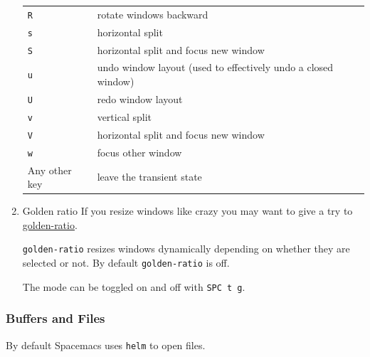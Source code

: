 \documentclass[11pt]{article}
\begin{document}
\begin{enumerate}
\begin{center}
\begin{tabular}{ll}
\texttt{R} & rotate windows backward\\
\texttt{s} & horizontal split\\
\texttt{S} & horizontal split and focus new window\\
\texttt{u} & undo window layout (used to effectively undo a closed window)\\
\texttt{U} & redo window layout\\
\texttt{v} & vertical split\\
\texttt{V} & horizontal split and focus new window\\
\texttt{w} & focus other window\\
Any other key & leave the transient state\\
\end{tabular}
\end{center}

\item Golden ratio
\label{sec:orga36ded9}
If you resize windows like crazy you may want to give a try to \href{https://github.com/roman/golden-ratio.el}{golden-ratio}.

\texttt{golden-ratio} resizes windows dynamically depending on whether they are
selected or not. By default \texttt{golden-ratio} is off.

The mode can be toggled on and off with \texttt{SPC t g}.
\end{enumerate}

\subsubsection{Buffers and Files}
\label{sec:orga019cc7}
By default Spacemacs uses \texttt{helm} to open files.
\end{document}
